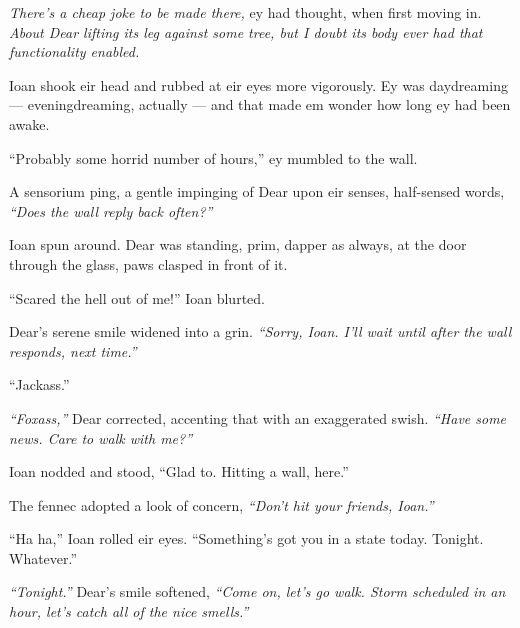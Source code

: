 \emph{There's a cheap joke to be made there,} ey had thought, when first moving in. \emph{About Dear lifting its leg against some tree, but I doubt its body ever had that functionality enabled.}

Ioan shook eir head and rubbed at eir eyes more vigorously. Ey was daydreaming --- eveningdreaming, actually --- and that made em wonder how long ey had been awake.

``Probably some horrid number of hours,'' ey mumbled to the wall.

A sensorium ping, a gentle impinging of Dear upon eir senses, half-sensed words, \emph{``Does the wall reply back often?''}

Ioan spun around. Dear was standing, prim, dapper as always, at the door through the glass, paws clasped in front of it.

``Scared the hell out of me!'' Ioan blurted.

Dear's serene smile widened into a grin. \emph{``Sorry, Ioan. I'll wait until after the wall responds, next time.''}

``Jackass.''

\emph{``Foxass,''} Dear corrected, accenting that with an exaggerated swish. \emph{``Have some news. Care to walk with me?''}

Ioan nodded and stood, ``Glad to. Hitting a wall, here.''

The fennec adopted a look of concern, \emph{``Don't hit your friends, Ioan.''}

``Ha ha,'' Ioan rolled eir eyes. ``Something's got you in a state today. Tonight. Whatever.''

\emph{``Tonight.''} Dear's smile softened, \emph{``Come on, let's go walk. Storm scheduled in an hour, let's catch all of the nice smells.''}
